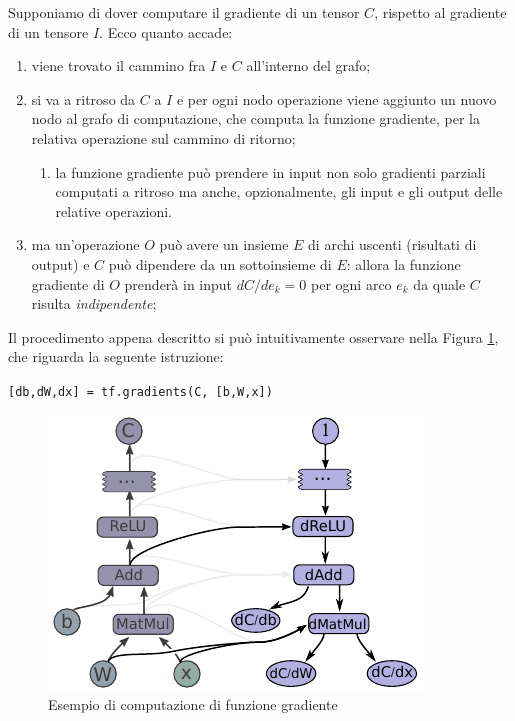 \documentclass[DIV=calc, paper=a4, fontsize=11pt]{scrartcl}	 %
\begin{document}
\begin{multicols}{2}
			Supponiamo di dover computare il gradiente di un tensor $C$, rispetto al gradiente di un tensore $I$. Ecco quanto accade:
			\begin{enumerate}
				\item viene trovato il cammino fra $I$ e $C$ all'interno del grafo;
				\item si va a ritroso da $C$ a $I$ e per ogni nodo operazione viene aggiunto un nuovo nodo al grafo di computazione, che computa la funzione gradiente, per la relativa operazione sul cammino di ritorno;
				\begin{enumerate}
					\item la funzione gradiente può prendere in input non solo gradienti parziali computati a ritroso ma anche, opzionalmente, gli input e gli output delle relative operazioni.
				\end{enumerate}
				\item ma un'operazione $O$ può avere un insieme $E$ di archi uscenti (risultati di output) e $C$ può dipendere da un sottoinsieme di $E$: allora la funzione gradiente di $O$ prenderà in input $dC/de_k = 0$ per ogni arco $e_k$ da quale $C$ risulta \textit{indipendente};
			\end{enumerate}
			Il procedimento appena descritto si può intuitivamente osservare nella Figura \ref{fig:gradients}, che riguarda la seguente istruzione:
			\begin{center}
				\texttt{[db,dW,dx] = tf.gradients(C, [b,W,x])}
			\end{center}
			\begin{figure}[H]
				\centering
				\includegraphics[scale=.9]{img/gradients.png}
				\caption{Esempio di computazione di funzione gradiente}
				\label{fig:gradients}
			\end{figure}
		

\end{multicols}
\end{document}
